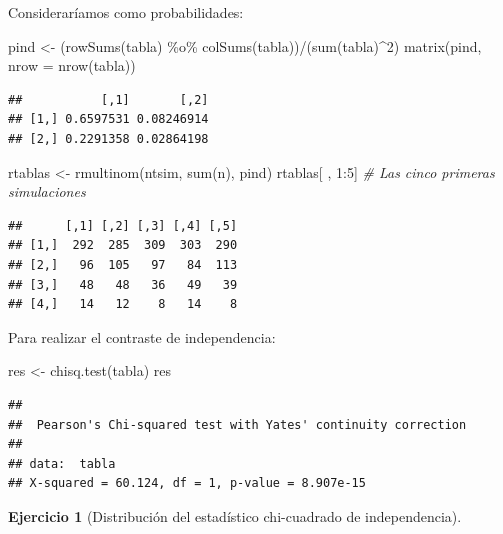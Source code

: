 \documentclass[
]{book}
\newenvironment{Shaded}{\begin{snugshade}}{\end{snugshade}}
\newcommand{\AttributeTok}[1]{\textcolor[rgb]{0.77,0.63,0.00}{#1}}
\newcommand{\CommentTok}[1]{\textcolor[rgb]{0.56,0.35,0.01}{\textit{#1}}}
\newcommand{\DecValTok}[1]{\textcolor[rgb]{0.00,0.00,0.81}{#1}}
\newcommand{\FunctionTok}[1]{\textcolor[rgb]{0.00,0.00,0.00}{#1}}
\newcommand{\NormalTok}[1]{#1}
\newcommand{\OtherTok}[1]{\textcolor[rgb]{0.56,0.35,0.01}{#1}}
\newcommand{\SpecialCharTok}[1]{\textcolor[rgb]{0.00,0.00,0.00}{#1}}
\theoremstyle{break}
\theoremstyle{definition}
\theoremstyle{definition}
\theoremstyle{definition}
\newtheorem{exercise}{Ejercicio}[chapter]
\theoremstyle{definition}
\theoremstyle{remark}
\begin{document}
Consideraríamos como probabilidades:

\begin{Shaded}
\begin{Highlighting}[]
\NormalTok{pind }\OtherTok{\textless{}{-}}\NormalTok{ (}\FunctionTok{rowSums}\NormalTok{(tabla) }\SpecialCharTok{\%o\%} \FunctionTok{colSums}\NormalTok{(tabla))}\SpecialCharTok{/}\NormalTok{(}\FunctionTok{sum}\NormalTok{(tabla)}\SpecialCharTok{\^{}}\DecValTok{2}\NormalTok{)}
\FunctionTok{matrix}\NormalTok{(pind, }\AttributeTok{nrow =} \FunctionTok{nrow}\NormalTok{(tabla))}
\end{Highlighting}
\end{Shaded}

\begin{verbatim}
##           [,1]       [,2]
## [1,] 0.6597531 0.08246914
## [2,] 0.2291358 0.02864198
\end{verbatim}

\begin{Shaded}
\begin{Highlighting}[]
\NormalTok{rtablas }\OtherTok{\textless{}{-}} \FunctionTok{rmultinom}\NormalTok{(ntsim, }\FunctionTok{sum}\NormalTok{(n), pind)}
\NormalTok{rtablas[ , }\DecValTok{1}\SpecialCharTok{:}\DecValTok{5}\NormalTok{] }\CommentTok{\# Las cinco primeras simulaciones}
\end{Highlighting}
\end{Shaded}

\begin{verbatim}
##      [,1] [,2] [,3] [,4] [,5]
## [1,]  292  285  309  303  290
## [2,]   96  105   97   84  113
## [3,]   48   48   36   49   39
## [4,]   14   12    8   14    8
\end{verbatim}

Para realizar el contraste de independencia:

\begin{Shaded}
\begin{Highlighting}[]
\NormalTok{res }\OtherTok{\textless{}{-}} \FunctionTok{chisq.test}\NormalTok{(tabla)}
\NormalTok{res}
\end{Highlighting}
\end{Shaded}

\begin{verbatim}
## 
##  Pearson's Chi-squared test with Yates' continuity correction
## 
## data:  tabla
## X-squared = 60.124, df = 1, p-value = 8.907e-15
\end{verbatim}

\begin{exercise}[Distribución del estadístico chi-cuadrado de independencia]
\protect\hypertarget{exr:chicuadind}{}{\label{exr:chicuadind} {} }
\end{exercise}
\end{document}
